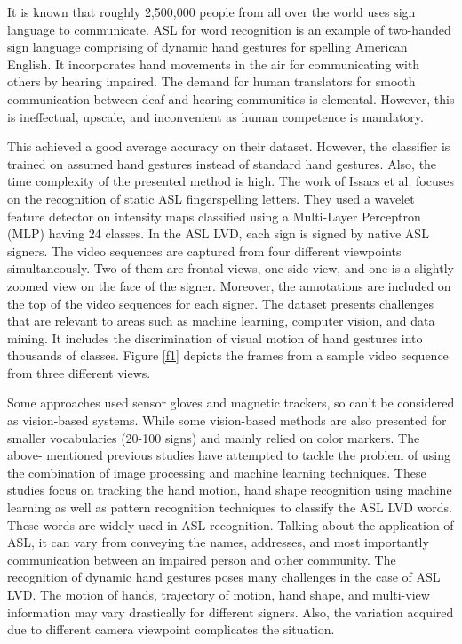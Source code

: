 \documentclass[
  manuscript=article,  %
  layout=preprint,  %
  year=20xx,
  volume=x,
]{joas}
\begin{document}
\par It is known that roughly 2,500,000 people from all over the world uses sign language to communicate. ASL for word recognition is an example of two-handed sign language comprising of dynamic hand gestures for spelling American English. It incorporates hand movements in the air for communicating with others by hearing impaired. The demand for human translators for smooth communication between deaf and hearing communities is elemental. However, this is ineffectual, upscale, and inconvenient as human competence is mandatory.
\par This achieved a good average accuracy on their dataset. However, the classifier is trained on assumed hand gestures instead of standard hand gestures. Also, the time complexity of the presented method is high. The work of Issacs et al. focuses on the recognition of static ASL fingerspelling letters. They used a wavelet feature detector on intensity maps classified using a Multi-Layer Perceptron (MLP) having 24 classes. In the ASL LVD, each sign is signed by native ASL signers. The video sequences are captured from four different viewpoints simultaneously. Two of them are frontal views, one side view, and one is a slightly zoomed view on the face of the signer. Moreover, the annotations are included on the top of the video sequences for each signer. The dataset presents challenges that are relevant to areas such as machine learning, computer vision, and data mining. It includes the discrimination of visual motion of hand gestures into thousands of classes. Figure \ref{f1} depicts the frames from a sample video sequence from three different views.
\par Some approaches used sensor gloves and magnetic trackers, so can’t be considered as vision-based systems. While some vision-based methods are also presented for smaller vocabularies (20-100 signs) and mainly relied on color markers. The above- mentioned previous studies have attempted to tackle the problem of using the combination of image processing and machine learning techniques. These studies focus on tracking the hand motion, hand shape recognition using machine learning as well as pattern recognition techniques to classify the ASL LVD words. These words are widely used in ASL recognition. Talking about the application of ASL, it can vary from conveying the names, addresses, and most importantly communication between an impaired person and other community. The recognition of dynamic hand gestures poses many challenges in the case of ASL LVD. The motion of hands, trajectory of motion, hand shape, and multi-view information may vary drastically for different signers. Also, the variation acquired due to different camera viewpoint complicates the situation.
\end{document}
